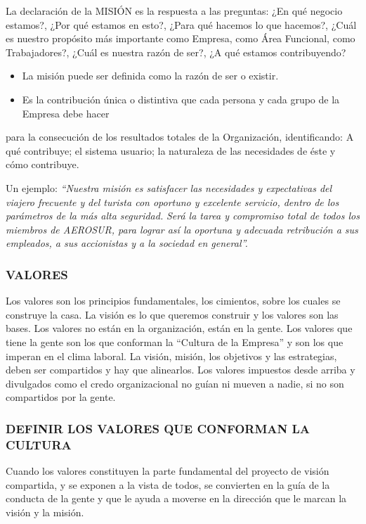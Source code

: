 La declaración de la MISIÓN es la respuesta a las preguntas: ¿En qué negocio estamos?, ¿Por qué estamos en esto?, ¿Para qué hacemos lo que hacemos?, ¿Cuál es nuestro propósito más importante como Empresa, como Área Funcional, como Trabajadores?, ¿Cuál es nuestra razón de ser?, ¿A qué estamos contribuyendo?

\begin{itemize}
  \item La misión puede ser definida como la razón de ser o existir.
  \item Es la contribución única o distintiva que cada persona y cada grupo de la Empresa debe hacer
\end{itemize}
para la consecución de los resultados totales de la Organización, identificando: A qué contribuye; el sistema usuario; la naturaleza de las necesidades de éste y cómo contribuye.

Un ejemplo: \textit{“Nuestra misión es satisfacer las necesidades y expectativas del viajero frecuente y} \textit{del turista con oportuno y excelente servicio, dentro de los parámetros de la más alta seguridad.} \textit{Será la tarea y compromiso total de todos los miembros de AEROSUR, para lograr así la} \textit{oportuna y adecuada retribución a sus empleados, a sus accionistas y a la sociedad en general”.}

\subsubsection*{VALORES}
Los valores son los principios fundamentales, los cimientos, sobre los cuales se construye la casa. La visión es lo que queremos construir y los valores son las bases. Los valores no están en la organización, están en la gente. Los valores que tiene la gente son los que conforman la “Cultura de la Empresa” y son los que imperan en el clima laboral. La visión, misión, los objetivos y las estrategias, deben ser compartidos y hay que alinearlos. Los valores impuestos desde arriba y divulgados como el credo organizacional no guían ni mueven a nadie, si no son compartidos por la gente.

\subsubsection*{DEFINIR LOS VALORES QUE CONFORMAN LA CULTURA}
Cuando los valores constituyen la parte fundamental del proyecto de visión compartida, y se exponen a la vista de todos, se convierten en la guía de la conducta de la gente y que le ayuda a moverse en la dirección que le marcan la visión y la misión.

